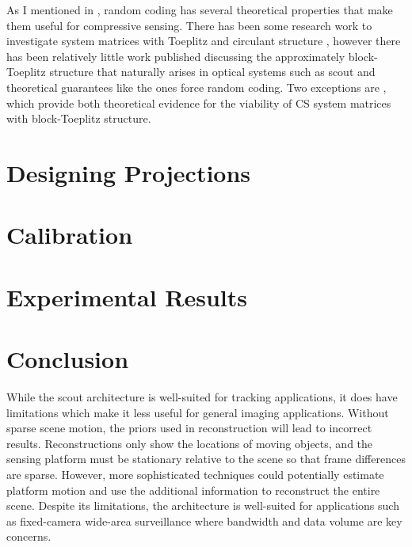 As I mentioned in , random coding has several theoretical properties that make them useful for compressive sensing. There has been some research work to investigate system matrices with Toeplitz and circulant structure \cite{bajwa2007toeplitz, rauhut2009circulant, romberg2009compressive}, however there has been relatively little work published discussing the approximately block-Toeplitz structure that naturally arises in optical systems such as \gls{scout} and theoretical guarantees like the ones force random coding. Two exceptions are \cite{sebert2008toeplitz, liu2008sparsesense}, which provide both theoretical evidence for the viability of CS system matrices with block-Toeplitz structure.

\section{Designing Projections}\label{sec:ScoutSimulations}

\section{Calibration}\label{sec:ScoutCalibrations}

\section{Experimental Results}\label{sec:ScoutExperimentalResults}


\section{Conclusion}

While the \gls{scout} architecture is well-suited for tracking applications, it does have limitations which make it less useful for general imaging applications. Without sparse scene motion, the priors used in reconstruction will lead to incorrect results. Reconstructions only show the locations of moving objects, and the sensing platform must be stationary relative to the scene so that frame differences are sparse. However, more sophisticated techniques could potentially estimate platform motion and use the additional information to reconstruct the entire scene. Despite its limitations, the architecture is well-suited for applications such as fixed-camera wide-area surveillance where bandwidth and data volume are key concerns.


%  
%



